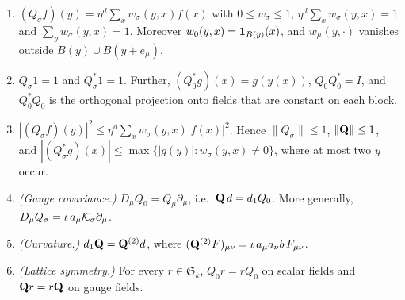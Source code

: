 \begin{lemma}\label{lem:avg}
\begin{enumerate}[label=(\alph*)]
\item $(Q_\sigma f)(y)=\eta^d\sum_xw_\sigma(y,x)f(x)$ with $0\le w_\sigma\le1$, $\eta^d\sum_xw_\sigma(y,x)=1$ and $\sum_yw_\sigma(y,x)=1$. Moreover $w_0(y,x)=\mathbf 1_{B(y)}(x)$, and $w_\mu(y,\cdot)$ vanishes outside $B(y)\cup B(y+e_\mu)$.
\item $Q_\sigma1=1$ and $Q_\sigma^*1=1$. Further, $(Q_0^*g)(x)=g(y(x))$, $Q_0Q_0^*=I$, and $Q_0^*Q_0$ is the orthogonal projection onto fields that are constant on each block.
\item $|(Q_\sigma f)(y)|^2\le\eta^d\sum_xw_\sigma(y,x)|f(x)|^2$. Hence $\|Q_\sigma\|\le1$, $\|\mathbf Q\|\le1$, and $|(Q_\sigma^* g)(x)|\le\max\{|g(y)|:w_\sigma(y,x)\neq0\}$, where at most two $y$ occur.
\item \emph{(Gauge covariance.)} $D_\mu Q_0=Q_\mu\partial_\mu$, i.e.\ $\mathbf Q\,d=d_1 Q_0$. More generally, $D_\mu Q_\sigma=\iota\,a_\mu\mathcal K_\sigma\partial_\mu$.
\item \emph{(Curvature.)} $d_1\mathbf Q=\mathbf Q^{(2)}d$, where $(\mathbf Q^{(2)}F)_{\mu\nu}=\iota\,a_\mu a_\nu b\,F_{\mu\nu}$.
\item \emph{(Lattice symmetry.)} For every $r\in\mathfrak S_k$, $Q_0r=rQ_0$ on scalar fields and $\mathbf Q r=r\mathbf Q$ on gauge fields.
\end{enumerate}
\end{lemma}

